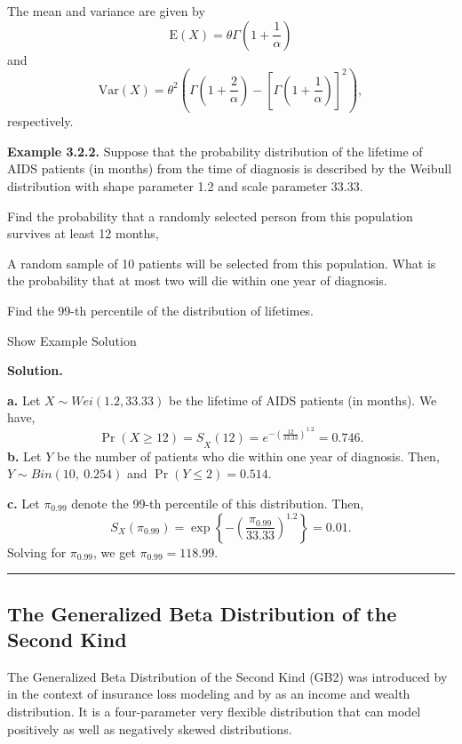 \documentclass[]{book}
\theoremstyle{definition}
\theoremstyle{definition}
\theoremstyle{definition}
\theoremstyle{remark}
\begin{document}
The mean and variance are given by
\[\mathrm{E}\left( X \right) = \theta\Gamma\left( 1 + \frac{1}{\alpha} \right)\]
and
\[\mathrm{Var}(X)= \theta^{2}\left( \Gamma\left( 1 + \frac{2}{\alpha} \right)  - \left\lbrack \Gamma\left( 1 + \frac{1}{\alpha} \right) \right\rbrack  ^{2}\right),\]
respectively.

\textbf{Example 3.2.2.} Suppose that the probability distribution of the
lifetime of AIDS patients (in months) from the time of diagnosis is
described by the Weibull distribution with shape parameter 1.2 and scale
parameter 33.33.

Find the probability that a randomly selected person from this
population survives at least 12 months,

A random sample of 10 patients will be selected from this population.
What is the probability that at most two will die within one year of
diagnosis.

Find the 99-th percentile of the distribution of lifetimes.

Show Example Solution

\hypertarget{toggleExampleLoss.2.2}{}
\textbf{Solution.}

\textbf{a.} Let \(X \sim Wei \left( 1.2,33.33 \right)\) be the lifetime
of AIDS patients (in months). We have,
\[{\Pr\left( X \geq 12 \right) = S}_{X}\left( 12 \right) = e^{- \left( \frac{12}{33.33} \right)^{1.2}} = 0.746.\]
\textbf{b.} Let \(Y\) be the number of patients who die within one year
of diagnosis. Then, \(Y\sim Bin\left( 10,\ 0.254 \right)\) and
\(\Pr\left( Y \leq 2 \right) = 0.514.\)

\textbf{c.} Let \(\pi_{0.99}\) denote the 99-th percentile of this
distribution. Then,
\[S_{X}\left( \pi_{0.99} \right) = \exp\left\{- \left( \frac{\pi_{0.99}}{33.33} \right)^{1.2}\right\} = 0.01.\]
Solving for \(\pi_{0.99}\), we get \(\pi_{0.99} = 118.99\).

\begin{center}\rule{0.5\linewidth}{\linethickness}\end{center}

\subsection{The Generalized Beta Distribution of the Second
Kind}\label{the-generalized-beta-distribution-of-the-second-kind}

The Generalized Beta Distribution of the Second Kind (GB2) was
introduced by \citet{venter1983transformed} in the context of insurance
loss modeling and by \citet{mcdonald1984some} as an income and wealth
distribution. It is a four-parameter very flexible distribution that can
model positively as well as negatively skewed distributions.
\end{document}
